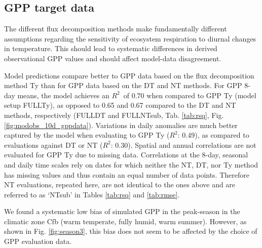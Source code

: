 \documentclass{myreport}
\newcommand{\rsq}{$R^2$}
\begin{document}
\clearpage

\subsection{GPP target data}
\label{sec:results_gppdata}

The different flux decomposition methods make fundamentally different assumptions regarding the sensitivity of ecosystem respiration to diurnal changes in temperature. This should lead to systematic differences in derived observational GPP values and should affect model-data disagreement.

Model predictions compare better to GPP data based on the flux decomposition method Ty \citep{wang17natpl} than for GPP data based on the DT and NT methods. For GPP  8-day means, the model achieves an \rsq\ of 0.70 when compared to GPP Ty (model setup FULL\textunderscore Ty), as opposed to 0.65 and 0.67 compared to the DT and NT methods, respectively (FULL\textunderscore DT and FULL\textunderscore NTsub, Tab. \ref{tab:rsq}, Fig. \ref{fig:modobs_10d_gppdata}). Variations in daily anomalies are much better captured by the model when evaluating to GPP Ty (\rsq : 0.49), as compared to evaluations against DT or NT (\rsq : 0.30). Spatial and annual correlations are not evaluated for GPP Ty due to missing data. Correlations at the 8-day, seasonal and daily time scales rely on dates for which neither the NT, DT, nor Ty method has missing values and thus contain an equal number of data points. Therefore NT evaluations, repeated here, are not identical to the ones above and are referred to as `NTsub' in Tables \ref{tab:rsq} and \ref{tab:rmse}. 
 
We found a systematic low bias of simulated GPP in the peak-season in the climatic zone Cfb (warm temperate, fully humid, warm summer). However, as shown in Fig. \ref{fig:season3}, this bias does not seem to be affected by the choice of GPP evaluation data.
\end{document}
